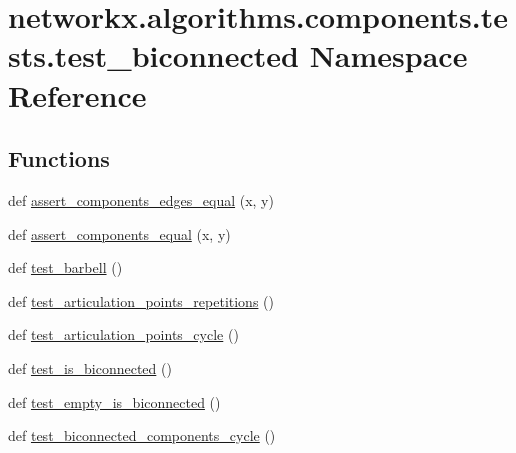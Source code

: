\hypertarget{namespacenetworkx_1_1algorithms_1_1components_1_1tests_1_1test__biconnected}{}\section{networkx.\+algorithms.\+components.\+tests.\+test\+\_\+biconnected Namespace Reference}
\label{namespacenetworkx_1_1algorithms_1_1components_1_1tests_1_1test__biconnected}
\subsection*{Functions}
\begin{DoxyCompactItemize}
\item 
def \hyperlink{namespacenetworkx_1_1algorithms_1_1components_1_1tests_1_1test__biconnected_a19ea1178b60510fa6e98ab8f311e6929}{assert\+\_\+components\+\_\+edges\+\_\+equal} (x, y)
\item 
def \hyperlink{namespacenetworkx_1_1algorithms_1_1components_1_1tests_1_1test__biconnected_a98d0077195f64e615e48f9444f69acb9}{assert\+\_\+components\+\_\+equal} (x, y)
\item 
def \hyperlink{namespacenetworkx_1_1algorithms_1_1components_1_1tests_1_1test__biconnected_aa6f507329660303c29f78d27c59c1641}{test\+\_\+barbell} ()
\item 
def \hyperlink{namespacenetworkx_1_1algorithms_1_1components_1_1tests_1_1test__biconnected_a655e43d8e1590d864b91179cb25d3bfc}{test\+\_\+articulation\+\_\+points\+\_\+repetitions} ()
\item 
def \hyperlink{namespacenetworkx_1_1algorithms_1_1components_1_1tests_1_1test__biconnected_a398c133e3d9d9b14e38f60a8a8cc65e0}{test\+\_\+articulation\+\_\+points\+\_\+cycle} ()
\item 
def \hyperlink{namespacenetworkx_1_1algorithms_1_1components_1_1tests_1_1test__biconnected_a1017a57d11b63bac6b90c33f032b7250}{test\+\_\+is\+\_\+biconnected} ()
\item 
def \hyperlink{namespacenetworkx_1_1algorithms_1_1components_1_1tests_1_1test__biconnected_af62565e5b37aef4b27bc1f16abc33512}{test\+\_\+empty\+\_\+is\+\_\+biconnected} ()
\item 
def \hyperlink{namespacenetworkx_1_1algorithms_1_1components_1_1tests_1_1test__biconnected_a509c24bc01cf5568d2a903fbf53ccc30}{test\+\_\+biconnected\+\_\+components\+\_\+cycle} ()
\item 

\end{DoxyCompactItemize}
